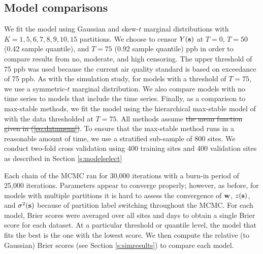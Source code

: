 \documentclass[useAMS,usenatbib,referee]{biom}
\providecommand{\DIFadd}[1]{{\protect\color{blue}\uwave{#1}}} %
\providecommand{\DIFdel}[1]{{\protect\color{red}\sout{#1}}}                      %
\providecommand{\DIFaddbegin}{} %
\providecommand{\DIFaddend}{} %
\providecommand{\DIFdelbegin}{} %
\providecommand{\DIFdelend}{} %
\begin{document}

\subsection{Model comparisons}
We fit the model using Gaussian and skew-$t$ marginal distributions with $K=1, 5, 6, 7, 8, 9, 10, 15$ partitions.
We choose to censor $Y(\mbox{\bf s})$ at $T = 0$, $T = 50$ (0.42 sample quantile), and $T = 75$ (0.92 sample quantile) ppb in order to compare results from no, moderate, and high censoring.
The upper threshold of 75 ppb was used because the current air quality standard is based on exceedance of 75 ppb.
As with the simulation study, for models with a threshold of $T = 75$, we use a symmetric-$t$ marginal distribution.
We also compare models with no time series to models that include the time series.
Finally, as a comparison to max-stable methods, we fit the model using the hierarchical max-stable model of \citet{Reich2012} with the data thresholded at $T = 75$.
All methods assume \DIFdelbegin \DIFdel{the mean function given in (\ref{eq:datamean})}\DIFdelend \DIFaddbegin \DIFadd{$\bX_t(\bs) = [1, \text{CMAQ}_t(\bs)]^\prime$}\DIFaddend .
To ensure that the max-stable method runs in a reasonable amount of time, we use a stratified sub-sample of 800 sites.
We conduct two-fold cross validation using 400 training sites and 400 validation sites as described in Section \ref{s:modelselect}

Each chain of the MCMC ran for 30,000 iterations with a burn-in period of 25,000 iterations.
Parameters appear to converge properly; however, as before, for models with multiple partitions it is hard to assess the convergence of $\mbox{\bf w}$, $z(\mbox{\bf s})$, and $\sigma^2(\mbox{\bf s})$ because of partition label switching throughout the MCMC.
For each model, Brier scores were averaged over all sites and days to obtain a single Brier score for each dataset.
At a particular threshold or quantile level, the model that fits the best is the one with the lowest score.
We then compute the relative (to Gaussian) Brier scores (see Section \ref{s:simresults}) to compare each model.
\end{document}
